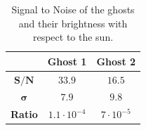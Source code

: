 \begin{table}[H] 
\centering
\begin{tabular}{|c|c|c|}
\hline
 & \textbf{Ghost 1} & \textbf{Ghost 2}\\
\hline
$\mathbf{S/N}$ & $33.9$ & $16.5$\\
\hline
$\mathbf{\sigma}$ & $7.9$ & $9.8$\\ 
\hline
\textbf{Ratio} & $1.1 \cdot 10^{-4}$ & $7 \cdot 10^{-5}$\\
\hline
\end{tabular}
\caption{Signal to Noise of the ghosts and their brightness with respect to the sun.}
\label{table:ghosts}
\end{table}
